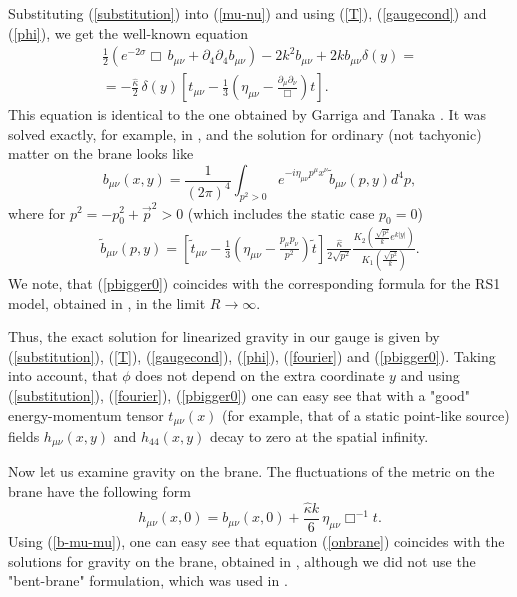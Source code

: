 \documentclass[a4paper,12pt]{article}
\begin{document}
Substituting (\ref{substitution}) into (\ref{mu-nu}) and using (\ref{T}),
(\ref{gaugecond}) and (\ref{phi}), we  get the well-known equation
\begin{eqnarray}\label{b-mu-mu}
 \frac{1}{2}\left(e^{-2\sigma}\Box\, b_{\mu\nu}
+ \partial_4\partial_4 b_{\mu\nu}\right)- 2k^2b_{\mu\nu}+2k
b_{\mu\nu}\delta(y) = \\ \nonumber  = -\frac{\hat
\kappa}{2}\,\delta(y)
\left[t_{\mu\nu}-\frac{1}{3}\left(\eta_{\mu\nu}-
\frac{\partial_{\mu}\partial_{\nu}}{\Box}\right)t\right].
\end{eqnarray}
This equation is identical to the one obtained by Garriga and
Tanaka \cite{GarTan}. It was solved exactly, for example, in
\cite{AIMVV}, and the solution for ordinary (not tachyonic) matter
on the brane looks like
\begin{equation}\label{fourier}
b_{\mu\nu}(x,y)=\frac{1}{(2\pi)^4}\int_{p^2>0} e^{-i\eta_{\mu\nu}p^\mu
x^\nu}\tilde b_{\mu\nu}(p,y)d^4p,
\end{equation}
where for $p^2 = -p_0^2 + \vec p^2 >0$ (which includes the  static case
$p_0=0$)
\begin{eqnarray}\label{pbigger0}
\tilde b_{\mu\nu}(p,y)=\left[\tilde
t_{\mu\nu}-\frac{1}{3}\left(\eta_{\mu\nu}-\frac{p_{\mu}p_{\nu}}{p^2}\right)\tilde
t\right]\frac{\hat\kappa}{2\sqrt{p^2}}
\frac{K_2\left(\frac{\sqrt{p^2}}{k}e^{k|y|}\right)}
{K_1\left(\frac{\sqrt{p^2}}{k}\right)}.
\end{eqnarray}
 We note, that (\ref{pbigger0})
coincides with the corresponding formula for the RS1 model,
obtained in \cite{SV}, in the limit  $R\to\infty$.

Thus, the exact solution for linearized gravity in our gauge is given by
(\ref{substitution}), (\ref{T}), (\ref{gaugecond}), (\ref{phi}),
(\ref{fourier}) and (\ref{pbigger0}). Taking into account, that $\phi$ does
not depend on the extra coordinate $y$ and using (\ref{substitution}),
(\ref{fourier}), (\ref{pbigger0}) one can easy see that with a "good"
energy-momentum tensor $t_{\mu\nu}(x)$ (for example, that of a static
point-like source) fields $h_{\mu\nu}(x,y)$ and $h_{44}(x,y)$ decay to zero
at the spatial infinity.

Now let us examine gravity on  the brane. The fluctuations of the
metric on the brane have the following form
\begin{equation}\label{onbrane}
h_{\mu\nu}(x,0)=b_{\mu\nu}(x,0)+\frac{\hat \kappa
k}{6}\,\eta_{\mu\nu}\Box^{-1}t.
\end{equation}
Using (\ref{b-mu-mu}), one can easy see that equation (\ref{onbrane})
coincides with the solutions for gravity on the brane, obtained in
\cite{GarTan,RKatz,AIMVV,Kakushadze}, although we did not use the
"bent-brane" formulation, which was used in \cite{GarTan,RKatz}.
\end{document}
